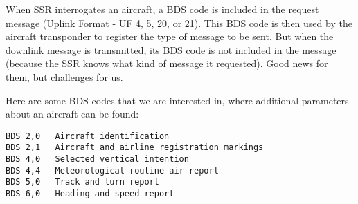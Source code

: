 When SSR interrogates an aircraft, a BDS code is included in the request
message (Uplink Format - UF 4, 5, 20, or 21). This BDS code is then used
by the aircraft transponder to register the type of message to be sent.
But when the downlink message is transmitted, its BDS code is not
included in the message (because the SSR knows what kind of message it
requested). Good news for them, but challenges for us.

Here are some BDS codes that we are interested in, where additional
parameters about an aircraft can be found:

\begin{verbatim}
BDS 2,0   Aircraft identification
BDS 2,1   Aircraft and airline registration markings
BDS 4,0   Selected vertical intention
BDS 4,4   Meteorological routine air report
BDS 5,0   Track and turn report
BDS 6,0   Heading and speed report
\end{verbatim}
